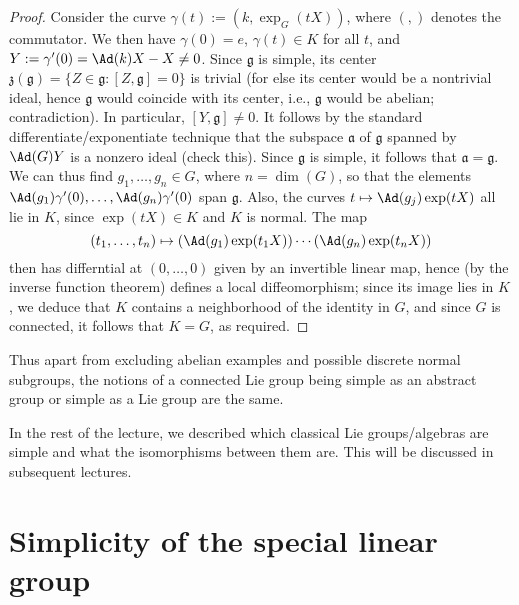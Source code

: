\documentclass[reqno]{amsart} 
\begin{document}
\begin{proof}
  Consider the curve $\gamma(t) := (k,\exp_G(t X))$, where $(,)$ denotes the commutator.  We then have $\gamma (0) = e$, $\gamma(t) \in K$ for all $t$, and $Y := \gamma '(0) = \Ad(k) X - X \neq 0$.  Since $\mathfrak{g}$ is simple, its center $\mathfrak{z}(\mathfrak{g}) = \{ Z \in \mathfrak{g} : [Z,\mathfrak{g}] = 0\}$ is trivial (for else its center would be a nontrivial ideal, hence $\mathfrak{g}$ would coincide with its center, i.e., $\mathfrak{g}$ would be abelian; contradiction).  In particular, $[Y,\mathfrak{g}] \neq 0$.  It follows by the standard differentiate/exponentiate technique that the subspace $\mathfrak{a}$ of $\mathfrak{g}$ spanned by $\Ad(G) Y$ is a nonzero ideal (check this).  Since $\mathfrak{g}$ is simple, it follows that $\mathfrak{a} = \mathfrak{g}$.  We can thus find $g_1,\dotsc,g_n \in G$, where $n = \dim(G)$, so that the elements $\Ad(g_1) \gamma'(0),\dotsc,\Ad(g_n) \gamma '(0)$ span $\mathfrak{g}$.  Also, the curves $t \mapsto \Ad(g_j) \exp(t X)$ all lie in $K$, since $\exp(tX) \in K$ and $K$ is normal.  The map
  \begin{equation*}
    (t_1,\dotsc,t_n) \mapsto (\Ad(g_1) \exp(t_1 X) ) \dotsb (\Ad(g_n) \exp(t_n X) )
  \end{equation*}
  then has differntial at $(0,\dotsc,0)$ given by an invertible linear map, hence (by the inverse function theorem) defines a local diffeomorphism; since its image lies in $K$, we deduce that $K$ contains a neighborhood of the identity in $G$, and since $G$ is connected, it follows that $K = G$, as required.
\end{proof}

Thus apart from excluding abelian examples and possible discrete normal subgroups, the notions of a connected Lie group being simple as an abstract group or simple as a Lie group are the same.

In the rest of the lecture, we described which classical Lie groups/algebras are simple and what the isomorphisms between them are.  This will be discussed in subsequent lectures.

\section{Simplicity of the special linear group\label{sec:simplicity-sln}}
\label{sec:org0a0c43a}
\end{document}
